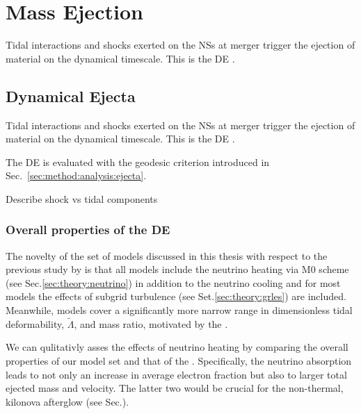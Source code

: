 \section{Mass Ejection}



Tidal interactions and shocks exerted on the \acp{NS} at merger trigger the ejection of material
on the dynamical timescale. This is the \ac{DE} \citep[\eg][]{Hotokezaka:2013b,Bauswein:2013yna,Radice:2016dwd,Radice:2018pdn}. 



\subsection{Dynamical Ejecta}


Tidal interactions and shocks exerted on the \acp{NS} at merger trigger the ejection of material
on the dynamical timescale. This is the \ac{DE} \citep[\eg][]{Hotokezaka:2013b,Bauswein:2013yna,Radice:2016dwd,Radice:2018pdn}. 

The \ac{DE} is evaluated with the geodesic criterion introduced in Sec.~\ref{sec:method:analysis:ejecta}.

Describe shock vs tidal components 

\subsubsection{Overall properties of the \ac{DE}}


The novelty of the set of models discussed in this thesis with respect to the 
previous study by \citet{Radice:2018pdn} is that all models include the neutrino heating via M0 scheme 
(see Sec.\ref{sec:theory:neutrino}) in addition to the neutrino cooling and for most models the effects 
of subgrid turbulence (see Set.\ref{sec:theory:grles}) are included.
Meanwhile, models cover a significantly more narrow range in 
dimensionless tidal deformability, $\tilde{\Lambda}$, and mass ratio, motivated by the \GW{}.

We can qulitativly asses the effects of neutrino heating by comparing the overall properties 
of our model set and that of the \citet{Radice:2018pdn}.
Specifically, the neutrino absorption leads to not only an increase in average electron 
fraction but also to larger total ejected mass and velocity. The latter two would be 
crucial for the non-thermal, kilonova afterglow (see Sec.).

